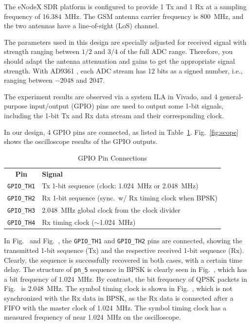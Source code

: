 \documentclass[journal,twoside]{IEEEtran}
\begin{document}
    The eNodeX SDR platform \cite{eNodeX} is configured to provide 1 Tx and 1 Rx
    at a sampling frequency of \qty{16.384}{MHz}.
    The GSM antenna carrier frequency is \qty{800}{MHz},
    and the two antennas have a line-of-sight (LoS) channel.

    The parameters used in this design
    are specially adjusted for received signal with strength ranging between $1/2$ and $3/4$ of the full ADC range.
    Therefore, you should adapt the antenna attenuation and gains to get the appropriate signal strength.
    With AD9361 \cite{ad9361},
    each ADC stream has 12 bits as a signed number, i.e., ranging between $-2048$ and $2047$.

    The experiment results are observed via a system ILA in Vivado,
    and 4 general-purpose input/output (GPIO) pins are used to output some 1-bit signals,
    including the 1-bit Tx and Rx data stream and their corresponding clock.

    In our design, 4 GPIO pins are connected, as listed in Table~\ref{tab:gpio_pins}.
    Fig.~\ref{fig:scope} shows the oscilloscope results of the GPIO outputs.
    \begin{table}[htbp]
      \caption{GPIO Pin Connections}
      \label{tab:gpio_pins}
      \renewcommand{\arraystretch}{1.2}
      \begin{tabularx}{\linewidth}{cX}
        \toprule\tabvertspace
        \textbf{Pin} & \textbf{Signal} \\
        \tabvertspace\midrule
        \texttt{GPIO\_TH1} & Tx 1-bit sequence (clock: \qty{1.024}{MHz} or \qty{2.048}{MHz}) \\
        \texttt{GPIO\_TH2} & Rx 1-bit sequence (sync.\ w/ Rx timing clock when BPSK) \\
        \texttt{GPIO\_TH3} & \qty{2.048}{MHz} global clock from the clock divider \\
        \texttt{GPIO\_TH4} & Rx timing clock ($\sim$\qty{1.024}{MHz}) \\
        \bottomrule
      \end{tabularx}
    \end{table}

    In Fig.~ and Fig.~,
    the \texttt{GPIO\_TH1} and \texttt{GPIO\_TH2} pins are connected,
    showing the transmitted 1-bit sequence (Tx) and the respective received 1-bit sequence (Rx).
    Clearly, the sequence is successfully recovered in both cases, with a certain time delay.
    The structure of \texttt{pn\_5} sequence in BPSK is clearly seen in Fig.~,
    which has a bit frequency of \qty{1.024}{MHz}.
    By contrast, the bit frequency of QPSK packets in Fig.~ is \qty{2.048}{MHz}.
    The symbol timing clock is shown in Fig.~,
    which is not synchronized with the Rx data in BPSK,
    as the Rx data is connected after a FIFO with the master clock of \qty{1.024}{MHz}.
    The symbol timing clock has a measured frequency of near \qty{1.024}{MHz} on the oscilloscope.
\end{document}
